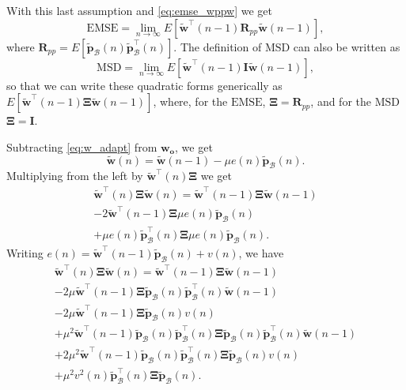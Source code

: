 With this last assumption and \eqref{eq:emse_wppw} we get
\begin{equation}
    \text{EMSE} = \lim_{n\rightarrow \infty} E \left[\tilde{\mathbf{w}}^\top(n-1)\mathbf{R}_{pp}\tilde{\mathbf{w}}(n-1)\right],\label{eq:emse_wRw} 
\end{equation}
where $\mathbf{R}_{pp} = E\left[ \tilde{\mathbf{p}}_{\mathcal{B}}(n)\tilde{\mathbf{p}}^\top_{\mathcal{B}}(n) \right]$.
The definition of $\text{MSD}$ can also be written as
\begin{equation}
    \text{MSD} = \lim_{n\rightarrow \infty} E \left[\tilde{\mathbf{w}}^\top(n-1)\mathbf{I}\tilde{\mathbf{w}}(n-1)\right], 
\end{equation}
so that we can write these quadratic forms generically as $E \left[\tilde{\mathbf{w}}^\top(n-1)\boldsymbol{\Xi}\tilde{\mathbf{w}}(n-1)\right]$, where, 
for the $\text{EMSE}$, $\boldsymbol{\Xi} = \mathbf{R}_{pp}$, and for the $\text{MSD}$ $\boldsymbol{\Xi} = \mathbf{I}$.

Subtracting \eqref{eq:w_adapt} from $\mathbf{w}_{\mathbf{o}}$, we get
\begin{equation}
    \tilde{\mathbf{w}}(n) = \tilde{\mathbf{w}}(n-1) - \mu e(n) \tilde{\mathbf{p}}_{\mathcal{B}}(n).\label{eq:w_tilde_adapt}
\end{equation}
Multiplying from the left by $\tilde{\mathbf{w}}^\top(n)\boldsymbol{\Xi}$ we get
\begin{multline}
    \tilde{\mathbf{w}}^\top(n)\boldsymbol{\Xi}\tilde{\mathbf{w}}(n) = \tilde{\mathbf{w}}^\top(n-1)\boldsymbol{\Xi}\tilde{\mathbf{w}}(n-1) \\- 2\tilde{\mathbf{w}}^\top(n-1)\boldsymbol{\Xi}\mu e(n)\tilde{\mathbf{p}}_{\mathcal{B}}(n) 
     \\+ \mu e(n)\tilde{\mathbf{p}}^\top_{\mathcal{B}}(n)\boldsymbol{\Xi}\mu e(n)\tilde{\mathbf{p}}_{\mathcal{B}}(n) .
\end{multline}
Writing $e(n) = \tilde{\mathbf{w}}^{\top}(n-1)\tilde{\mathbf{p}}_{\mathcal{B}}(n) + v(n)$, we have
\begin{multline}
    \tilde{\mathbf{w}}^\top(n)\boldsymbol{\Xi}\tilde{\mathbf{w}}(n) = \tilde{\mathbf{w}}^\top(n-1)\boldsymbol{\Xi}\tilde{\mathbf{w}}(n-1)\\-
    2\mu\tilde{\mathbf{w}}^\top(n-1)\boldsymbol{\Xi}\tilde{\mathbf{p}}_{\mathcal{B}}(n)\tilde{\mathbf{p}}_{\mathcal{B}}^\top(n)\tilde{\mathbf{w}}(n-1) \\-
    2\mu\tilde{\mathbf{w}}^\top(n-1)\boldsymbol{\Xi}\tilde{\mathbf{p}}_{\mathcal{B}}(n)v(n) \\+
    \mu^2 \tilde{\mathbf{w}}^{\top}(n-1)\tilde{\mathbf{p}}_{\mathcal{B}}(n)\tilde{\mathbf{p}}^\top_{\mathcal{B}}(n)\boldsymbol{\Xi}\tilde{\mathbf{p}}_{\mathcal{B}}(n)\tilde{\mathbf{p}}_{\mathcal{B}}^\top(n)\tilde{\mathbf{w}}(n-1)\\+
    2\mu^2 \tilde{\mathbf{w}}^{\top}(n-1)\tilde{\mathbf{p}}_{\mathcal{B}}(n)\tilde{\mathbf{p}}^\top_{\mathcal{B}}(n)\boldsymbol{\Xi}\tilde{\mathbf{p}}_{\mathcal{B}}(n)v(n)\\+
    \mu^2 v^2(n)\tilde{\mathbf{p}}^\top_{\mathcal{B}}(n)\boldsymbol{\Xi}\tilde{\mathbf{p}}_{\mathcal{B}}(n).\label{eq:wSw}
\end{multline}


